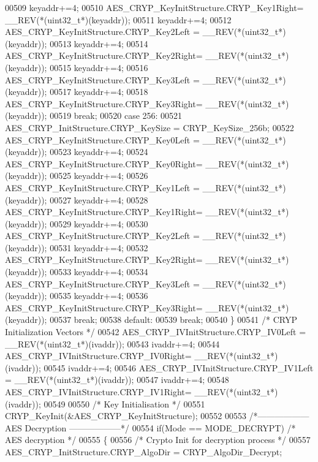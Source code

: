\begin{DoxyCode}
00509     keyaddr+=4;
00510     AES\_CRYP\_KeyInitStructure.CRYP\_Key1Right= \_\_REV(*(uint32\_t*)(keyaddr));
00511     keyaddr+=4;
00512     AES\_CRYP\_KeyInitStructure.CRYP\_Key2Left = \_\_REV(*(uint32\_t*)(keyaddr));
00513     keyaddr+=4;
00514     AES\_CRYP\_KeyInitStructure.CRYP\_Key2Right= \_\_REV(*(uint32\_t*)(keyaddr));
00515     keyaddr+=4;
00516     AES\_CRYP\_KeyInitStructure.CRYP\_Key3Left = \_\_REV(*(uint32\_t*)(keyaddr));
00517     keyaddr+=4;
00518     AES\_CRYP\_KeyInitStructure.CRYP\_Key3Right= \_\_REV(*(uint32\_t*)(keyaddr));
00519     \textcolor{keywordflow}{break};
00520     \textcolor{keywordflow}{case} 256:
00521     AES\_CRYP\_InitStructure.CRYP_KeySize  = CRYP_KeySize_256b;
00522     AES\_CRYP\_KeyInitStructure.CRYP\_Key0Left = \_\_REV(*(uint32\_t*)(keyaddr));
00523     keyaddr+=4;
00524     AES\_CRYP\_KeyInitStructure.CRYP\_Key0Right= \_\_REV(*(uint32\_t*)(keyaddr));
00525     keyaddr+=4;
00526     AES\_CRYP\_KeyInitStructure.CRYP\_Key1Left = \_\_REV(*(uint32\_t*)(keyaddr));
00527     keyaddr+=4;
00528     AES\_CRYP\_KeyInitStructure.CRYP\_Key1Right= \_\_REV(*(uint32\_t*)(keyaddr));
00529     keyaddr+=4;
00530     AES\_CRYP\_KeyInitStructure.CRYP\_Key2Left = \_\_REV(*(uint32\_t*)(keyaddr));
00531     keyaddr+=4;
00532     AES\_CRYP\_KeyInitStructure.CRYP\_Key2Right= \_\_REV(*(uint32\_t*)(keyaddr));
00533     keyaddr+=4;
00534     AES\_CRYP\_KeyInitStructure.CRYP\_Key3Left = \_\_REV(*(uint32\_t*)(keyaddr));
00535     keyaddr+=4;
00536     AES\_CRYP\_KeyInitStructure.CRYP\_Key3Right= \_\_REV(*(uint32\_t*)(keyaddr));
00537     \textcolor{keywordflow}{break};
00538     \textcolor{keywordflow}{default}:
00539     \textcolor{keywordflow}{break};
00540   \}
00541   \textcolor{comment}{/* CRYP Initialization Vectors */}
00542   AES\_CRYP\_IVInitStructure.CRYP\_IV0Left = \_\_REV(*(uint32\_t*)(ivaddr));
00543   ivaddr+=4;
00544   AES\_CRYP\_IVInitStructure.CRYP\_IV0Right= \_\_REV(*(uint32\_t*)(ivaddr));
00545   ivaddr+=4;
00546   AES\_CRYP\_IVInitStructure.CRYP\_IV1Left = \_\_REV(*(uint32\_t*)(ivaddr));
00547   ivaddr+=4;
00548   AES\_CRYP\_IVInitStructure.CRYP\_IV1Right= \_\_REV(*(uint32\_t*)(ivaddr));
00549 
00550   \textcolor{comment}{/* Key Initialisation */}
00551   CRYP_KeyInit(&AES\_CRYP\_KeyInitStructure);
00552 
00553   \textcolor{comment}{/*------------------ AES Decryption ------------------*/}
00554   \textcolor{keywordflow}{if}(Mode == MODE_DECRYPT) \textcolor{comment}{/* AES decryption */}
00555   \{
00556     \textcolor{comment}{/* Crypto Init for decryption process */}
00557     AES\_CRYP\_InitStructure.CRYP_AlgoDir = CRYP_AlgoDir_Decrypt;

\end{DoxyCode}

